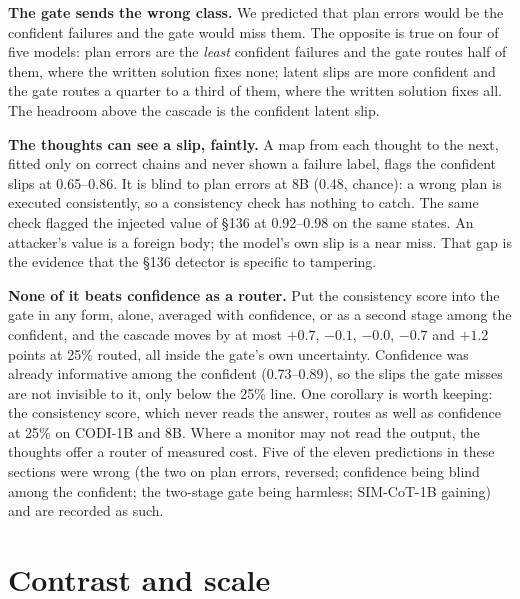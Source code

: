 \documentclass{article}
\begin{document}
\begin{plain}
\textbf{The gate sends the wrong class.} We predicted that plan errors would be the confident failures and the gate would miss them. The opposite is true on four of five models: plan errors are the \emph{least} confident failures and the gate routes half of them, where the written solution fixes none; latent slips are more confident and the gate routes a quarter to a third of them, where the written solution fixes all. The headroom above the cascade is the confident latent slip.

\textbf{The thoughts can see a slip, faintly.} A map from each thought to the next, fitted only on correct chains and never shown a failure label, flags the confident slips at 0.65--0.86. It is blind to plan errors at 8B (0.48, chance): a wrong plan is executed consistently, so a consistency check has nothing to catch. The same check flagged the injected value of \S136 at 0.92--0.98 on the same states. An attacker's value is a foreign body; the model's own slip is a near miss. That gap is the evidence that the \S136 detector is specific to tampering.

\textbf{None of it beats confidence as a router.} Put the consistency score into the gate in any form, alone, averaged with confidence, or as a second stage among the confident, and the cascade moves by at most $+0.7$, $-0.1$, $-0.0$, $-0.7$ and $+1.2$ points at 25\% routed, all inside the gate's own uncertainty. Confidence was already informative among the confident (0.73--0.89), so the slips the gate misses are not invisible to it, only below the 25\% line. One corollary is worth keeping: the consistency score, which never reads the answer, routes as well as confidence at 25\% on CODI-1B and 8B. Where a monitor may not read the output, the thoughts offer a router of measured cost. Five of the eleven predictions in these sections were wrong (the two on plan errors, reversed; confidence being blind among the confident; the two-stage gate being harmless; SIM-CoT-1B gaining) and are recorded as such.
\end{plain}

\section{Contrast and scale}
\end{document}
